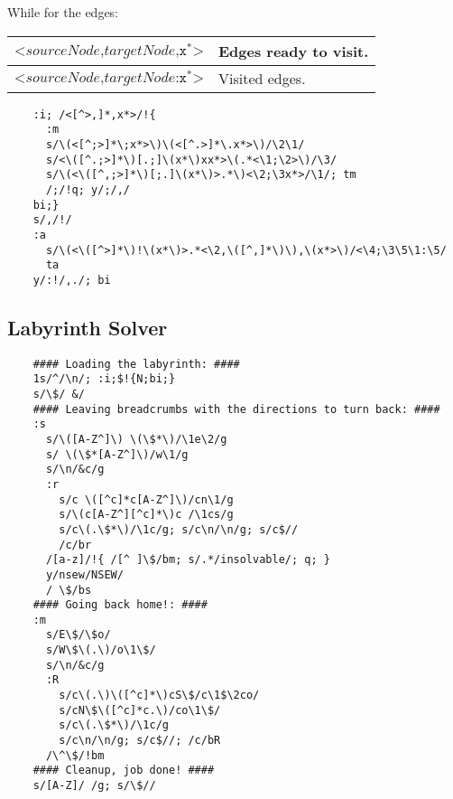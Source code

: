 While for the edges:
\begin{center}
	\begin{tabular}{|l|l|}
		\hline
		$\texttt{<}sourceNode\texttt{,}targetNode\texttt{,x}^*\texttt{>}$
			& Edges ready to visit.\\
		\hline
		$\texttt{<}sourceNode\texttt{,}targetNode\texttt{:x}^*\texttt{>}$
			& Visited edges.\\
		\hline
	\end{tabular}
\end{center}

\begin{Verbatim}
	:i; /<[^>,]*,x*>/!{
	  :m
	  s/\(<[^;>]*\;x*>\)\(<[^.>]*\.x*>\)/\2\1/
	  s/<\([^.;>]*\)[.;]\(x*\)xx*>\(.*<\1;\2>\)/\3/
	  s/\(<\([^,;>]*\)[;.]\(x*\)>.*\)<\2;\3x*>/\1/; tm
	  /;/!q; y/;/,/
	bi;}
	s/,/!/
	:a
	  s/\(<\([^>]*\)!\(x*\)>.*<\2,\([^,]*\)\),\(x*>\)/<\4;\3\5\1:\5/
	  ta
	y/:!/,./; bi
\end{Verbatim}


\subsection{Labyrinth Solver}


\begin{Verbatim}
	#### Loading the labyrinth: ####
	1s/^/\n/; :i;$!{N;bi;}
	s/\$/ &/
	#### Leaving breadcrumbs with the directions to turn back: ####
	:s
	  s/\([A-Z^]\) \(\$*\)/\1e\2/g
	  s/ \(\$*[A-Z^]\)/w\1/g
	  s/\n/&c/g
	  :r
	    s/c \([^c]*c[A-Z^]\)/cn\1/g
	    s/\(c[A-Z^][^c]*\)c /\1cs/g
	    s/c\(.\$*\)/\1c/g; s/c\n/\n/g; s/c$//
	    /c/br
	  /[a-z]/!{ /[^ ]\$/bm; s/.*/insolvable/; q; }
	  y/nsew/NSEW/
	  / \$/bs
	#### Going back home!: ####
	:m
	  s/E\$/\$o/
	  s/W\$\(.\)/o\1\$/
	  s/\n/&c/g
	  :R
	    s/c\(.\)\([^c]*\)cS\$/c\1$\2co/
	    s/cN\$\([^c]*c.\)/co\1\$/
	    s/c\(.\$*\)/\1c/g
	    s/c\n/\n/g; s/c$//; /c/bR
	  /\^\$/!bm
	#### Cleanup, job done! ####
	s/[A-Z]/ /g; s/\$//
\end{Verbatim}




